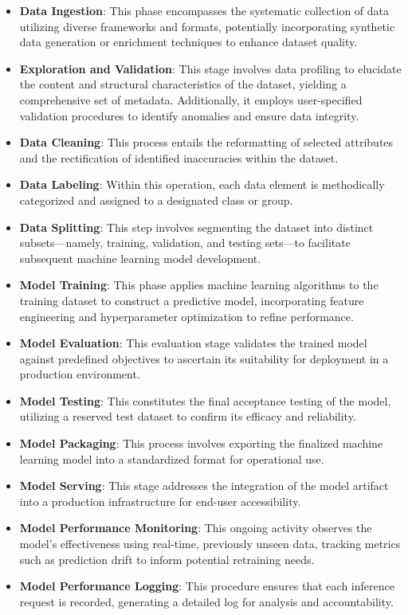 \begin{itemize}
    \item \textbf{Data Ingestion}: This phase encompasses the systematic collection of data utilizing diverse frameworks and formats, potentially incorporating synthetic data generation or enrichment techniques to enhance dataset quality.
    \item \textbf{Exploration and Validation}: This stage involves data profiling to elucidate the content and structural characteristics of the dataset, yielding a comprehensive set of metadata. Additionally, it employs user-specified validation procedures to identify anomalies and ensure data integrity.
    \item \textbf{Data Cleaning}: This process entails the reformatting of selected attributes and the rectification of identified inaccuracies within the dataset.
    \item \textbf{Data Labeling}: Within this operation, each data element is methodically categorized and assigned to a designated class or group.
    \item \textbf{Data Splitting}: This step involves segmenting the dataset into distinct subsets—namely, training, validation, and testing sets—to facilitate subsequent machine learning model development.
    \item \textbf{Model Training}: This phase applies machine learning algorithms to the training dataset to construct a predictive model, incorporating feature engineering and hyperparameter optimization to refine performance.
    \item \textbf{Model Evaluation}: This evaluation stage validates the trained model against predefined objectives to ascertain its suitability for deployment in a production environment.
    \item \textbf{Model Testing}: This constitutes the final acceptance testing of the model, utilizing a reserved test dataset to confirm its efficacy and reliability.
    \item \textbf{Model Packaging}: This process involves exporting the finalized machine learning model into a standardized format for operational use.
    \item \textbf{Model Serving}: This stage addresses the integration of the model artifact into a production infrastructure for end-user accessibility.
    \item \textbf{Model Performance Monitoring}: This ongoing activity observes the model’s effectiveness using real-time, previously unseen data, tracking metrics such as prediction drift to inform potential retraining needs.
    \item \textbf{Model Performance Logging}: This procedure ensures that each inference request is recorded, generating a detailed log for analysis and accountability.
\end{itemize}

